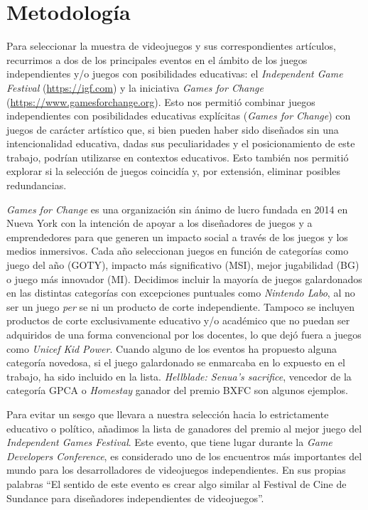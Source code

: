 \documentclass[spanish]{textolivre}
\begin{document}
\section{Metodología}
Para seleccionar la muestra de videojuegos y sus correspondientes artículos, recurrimos a dos de los principales eventos en el ámbito de los juegos independientes y/o juegos con posibilidades educativas: el \emph{Independent Game Festival} (\url{https://igf.com}) y la iniciativa \emph{Games for Change} (\url{https://www.gamesforchange.org}). Esto nos permitió combinar juegos independientes con posibilidades educativas explícitas (\emph{Games for Change}) con juegos de carácter artístico que, si bien pueden haber sido diseñados sin una intencionalidad educativa, dadas sus peculiaridades y el posicionamiento de este trabajo, podrían utilizarse en contextos educativos. Esto también nos permitió explorar si la selección de juegos coincidía y, por extensión, eliminar posibles redundancias.

\emph{Games for Change} es una organización sin ánimo de lucro fundada en 2014 en Nueva York con la intención de apoyar a los diseñadores de juegos y a emprendedores para que generen un impacto social a través de los juegos y los medios inmersivos. Cada año seleccionan juegos en función de categorías como juego del año (GOTY), impacto más significativo (MSI), mejor jugabilidad (BG) o juego más innovador (MI). Decidimos incluir la mayoría de juegos galardonados en las distintas categorías con excepciones puntuales como \emph{Nintendo Labo}, al no ser un juego \emph{per} se ni un producto de corte independiente. Tampoco se incluyen productos de corte exclusivamente educativo y/o académico que no puedan ser adquiridos de una forma convencional por los docentes, lo que dejó fuera a juegos como \emph{Unicef Kid Power}. Cuando alguno de los eventos ha propuesto alguna categoría novedosa, si el juego galardonado se enmarcaba en lo expuesto en el trabajo, ha sido incluido en la lista. \emph{Hellblade: Senua’s sacrifice}, vencedor de la categoría GPCA o \emph{Homestay} ganador del premio BXFC son algunos ejemplos.

Para evitar un sesgo que llevara a nuestra selección hacia lo estrictamente educativo o político, añadimos la lista de ganadores del premio al mejor juego del \emph{Independent Games Festival}. Este evento, que tiene lugar durante la \emph{Game Developers Conference}, es considerado uno de los encuentros más importantes del mundo para los desarrolladores de videojuegos independientes. En sus propias palabras “El sentido de este evento es crear algo similar al Festival de Cine de Sundance para diseñadores independientes de videojuegos”.
\end{document}
